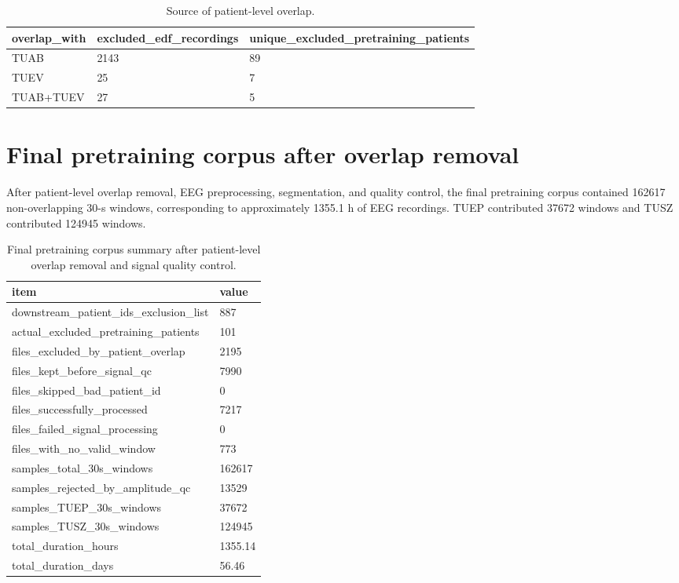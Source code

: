 \documentclass[11pt]{article}
\begin{document}
\begin{table}[htbp]
\centering
\caption{Source of patient-level overlap.}
\label{tab:sup_overlap_by_downstream}
\begin{tabular}{lll}
\toprule
overlap\_with & excluded\_edf\_recordings & unique\_excluded\_pretraining\_patients \\
\midrule
TUAB & 2143 & 89 \\
TUEV & 25 & 7 \\
TUAB+TUEV & 27 & 5 \\
\bottomrule
\end{tabular}
\end{table}


\section*{Final pretraining corpus after overlap removal}
After patient-level overlap removal, EEG preprocessing, segmentation, and quality control, the final pretraining corpus contained 162617 non-overlapping 30-s windows, corresponding to approximately 1355.1 h of EEG recordings. TUEP contributed 37672 windows and TUSZ contributed 124945 windows.

\begin{table}[htbp]
\centering
\caption{Final pretraining corpus summary after patient-level overlap removal and signal quality control.}
\label{tab:sup_final_pretraining_summary}
\begin{tabular}{ll}
\toprule
item & value \\
\midrule
downstream\_patient\_ids\_exclusion\_list & 887 \\
actual\_excluded\_pretraining\_patients & 101 \\
files\_excluded\_by\_patient\_overlap & 2195 \\
files\_kept\_before\_signal\_qc & 7990 \\
files\_skipped\_bad\_patient\_id & 0 \\
files\_successfully\_processed & 7217 \\
files\_failed\_signal\_processing & 0 \\
files\_with\_no\_valid\_window & 773 \\
samples\_total\_30s\_windows & 162617 \\
samples\_rejected\_by\_amplitude\_qc & 13529 \\
samples\_TUEP\_30s\_windows & 37672 \\
samples\_TUSZ\_30s\_windows & 124945 \\
total\_duration\_hours & 1355.14 \\
total\_duration\_days & 56.46 \\
\bottomrule
\end{tabular}
\end{table}
\end{document}
